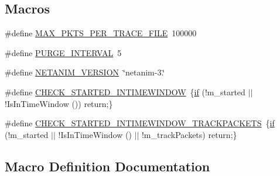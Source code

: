 \subsection*{Macros}
\begin{DoxyCompactItemize}
\item 
\#define \hyperlink{animation-interface_8h_aaf48c6faa3c30a441345e0d3610a7fc6}{M\+A\+X\+\_\+\+P\+K\+T\+S\+\_\+\+P\+E\+R\+\_\+\+T\+R\+A\+C\+E\+\_\+\+F\+I\+LE}~100000
\item 
\#define \hyperlink{animation-interface_8h_af3477c4d63f16798ef27f5c6b0e2d96c}{P\+U\+R\+G\+E\+\_\+\+I\+N\+T\+E\+R\+V\+AL}~5
\item 
\#define \hyperlink{animation-interface_8h_a8ab33f7647587ecba4a19c2a4b03ff86}{N\+E\+T\+A\+N\+I\+M\+\_\+\+V\+E\+R\+S\+I\+ON}~\char`\"{}netanim-\/3.\char`\"{}
\item 
\#define \hyperlink{animation-interface_8h_ad6a3f362c0243ea755a8313f148f6239}{C\+H\+E\+C\+K\+\_\+\+S\+T\+A\+R\+T\+E\+D\+\_\+\+I\+N\+T\+I\+M\+E\+W\+I\+N\+D\+OW}~\{\hyperlink{loss__OH__large__cities__urban_8m_ac77b6cfa3068152087725fe54b4ae8c8}{if} (!m\+\_\+started $\vert$$\vert$ !Is\+In\+Time\+Window ()) return;\}
\item 
\#define \hyperlink{animation-interface_8h_acdf351a3155a6ccf1813189e10dba8f5}{C\+H\+E\+C\+K\+\_\+\+S\+T\+A\+R\+T\+E\+D\+\_\+\+I\+N\+T\+I\+M\+E\+W\+I\+N\+D\+O\+W\+\_\+\+T\+R\+A\+C\+K\+P\+A\+C\+K\+E\+TS}~\{\hyperlink{loss__OH__large__cities__urban_8m_ac77b6cfa3068152087725fe54b4ae8c8}{if} (!m\+\_\+started $\vert$$\vert$ !Is\+In\+Time\+Window () $\vert$$\vert$ !m\+\_\+track\+Packets) return;\}
\end{DoxyCompactItemize}


\subsection{Macro Definition Documentation}
